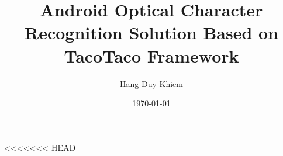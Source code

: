 
<<<<<<< HEAD
\def\thesislang{english} %

\author{Hang Duy Khiem} %
\def\thesis{Thesis}%

\title{Android Optical Character Recognition Solution Based on TacoTaco Framework}
\def\metropoliadegree {Bachelor of Engineering} %
\def\metropoliadegreeprogramme {Information Technology}
\def\metropoliaspecialisation {Software Engineering}
\def\metropoliainstructors {
Patrick Ausderau, Principal Lecturer
}
\def\metropoliakeywords {android, ocr, tacotaco, framework, }
\date{\longmonth\today}


